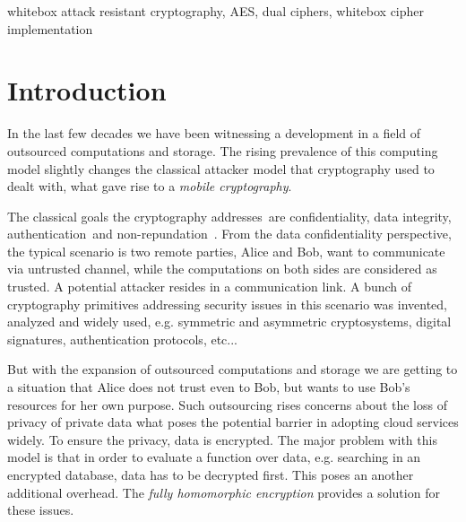 \documentclass[11pt,oneside,final]{fithesis2}
\begin{document}
 
\begin{ThesisKeyWords}
whitebox attack resistant cryptography, AES, dual ciphers, whitebox cipher implementation
\end{ThesisKeyWords}
\MainMatter
\renewcommand{\contentsname}{Table of contents}

\tableofcontents


\chapter{Introduction}    
    In the last few decades we have been witnessing a development in a field of outsourced computations and storage.
    The rising prevalence of this computing model slightly changes the classical attacker model 
    that cryptography used to dealt with, what gave rise to a \emph{mobile cryptography}.

    The classical goals the cryptography addresses~are confidentiality, data integrity, authentication~and non-repundation~\citep{Menezes:1996:HAC:548089}.
    From the data confidentiality perspective, the typical scenario is two remote parties, Alice and Bob, want to communicate via untrusted channel, while the 
    computations on both sides are considered as trusted. A potential attacker resides in a communication link.
    A bunch of cryptography primitives addressing security issues in this scenario
    was invented, analyzed and widely used, e.g. symmetric and asymmetric cryptosystems, digital signatures, authentication protocols, etc...
    
    But with the expansion of outsourced computations and storage we are getting to a situation that Alice does not trust even to Bob, but wants 
    to use Bob's resources for her own purpose. Such outsourcing rises concerns about the loss of privacy of private data what poses the potential
    barrier in adopting cloud services widely. To ensure the privacy, data is encrypted. The major problem with this model 
    is that in order to evaluate a function over data, e.g. searching in an encrypted database, data has to be decrypted first. This poses an another additional 
    overhead. The \emph{fully homomorphic encryption} provides a solution for these issues.
    
\end{document}
